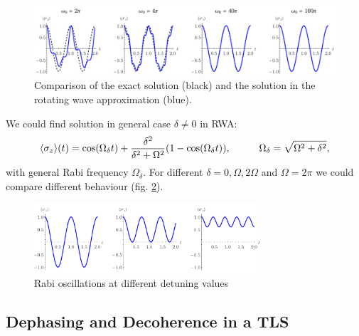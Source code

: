 \begin{figure}[h]
    \centering
    \includegraphics[width=1.0\textwidth]{figs/p23_1.pdf}
    \caption{Comparison of the exact solution (black) and the solution in the rotating wave approximation (blue).}
    \label{fig:rwa}
\end{figure}


We could find solution in general case $\delta \neq 0$ in RWA:
\begin{equation*}
	\langle \sigma_z\rangle(t) = \cos (\Omega_\delta t) + \frac{\delta ^2}{\delta ^2+\Omega ^2}(1-\cos (\Omega_\delta t )),
	\hspace{10 mm} 
	\Omega_\delta = \sqrt{\Omega^2 + \delta^2},
\end{equation*}
with general Rabi frequency $\Omega_\delta$. For different $\delta = 0, \Omega, 2 \Omega$ and $\Omega=2\pi$ we could compare different behaviour (fig. \ref{fig:rod}).

\begin{figure}[h]
    \centering
    \includegraphics[width=0.75\textwidth]{figs/p23_2.pdf}
    \caption{Rabi oscillations at different detuning values}
    \label{fig:rod}
\end{figure}


\subsection{Dephasing and Decoherence in a TLS}

